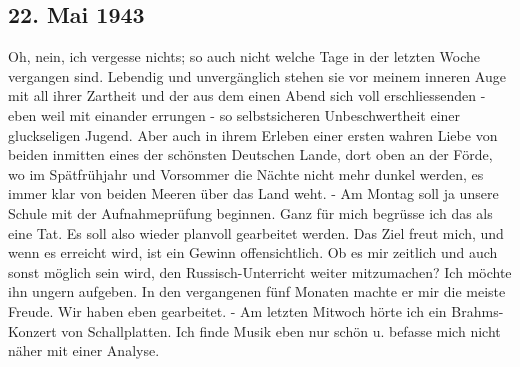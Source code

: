 \subsection{22. Mai 1943}

Oh, nein, ich vergesse nichts; so auch nicht welche Tage in der letzten Woche vergangen sind.
Lebendig und unverg\"{a}nglich stehen sie vor meinem inneren Auge mit all ihrer Zartheit und der aus dem einen Abend sich voll erschliessenden - eben weil mit einander errungen - so selbstsicheren Unbeschwertheit einer gluckseligen Jugend.
Aber auch in ihrem Erleben einer ersten wahren Liebe von beiden inmitten eines der sch\"{o}nsten Deutschen Lande, dort oben an der F\"{o}rde, wo im Sp\"{a}tfr\"{u}hjahr und Vorsommer die N\"{a}chte nicht mehr dunkel werden, es immer klar von beiden Meeren \"{u}ber das Land weht.
- Am Montag soll ja unsere Schule mit der Aufnahmepr\"{u}fung beginnen.
Ganz f\"{u}r mich begr\"{u}sse ich das als eine Tat.
Es soll also wieder planvoll gearbeitet werden.
Das Ziel freut mich, und wenn es erreicht wird, ist ein Gewinn offensichtlich.
Ob es mir zeitlich und auch sonst m\"{o}glich sein wird, den Russisch-Unterricht weiter mitzumachen?
Ich m\"{o}chte ihn ungern aufgeben.
In den vergangenen f\"{u}nf Monaten machte er mir die meiste Freude.
Wir haben eben gearbeitet.
- Am letzten Mitwoch h\"{o}rte ich ein Brahms-Konzert von Schallplatten.
Ich finde Musik eben nur sch\"{o}n u. befasse mich nicht n\"{a}her mit einer Analyse.

\clearpage
